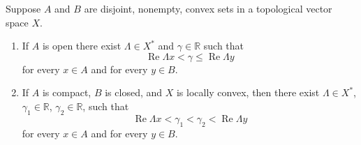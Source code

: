 \begin{theorem}
  \label{theorem-Hahn-Banach}
  Suppose \( A \) and \( B \) are disjoint, nonempty, convex sets in a topological vector space \( X \).
  \begin{enumerate}
    \item If \( A \) is open there exist \( \Lambda \in X^* \) and \( \gamma \in \mathbb{R} \) such that
          \[
            \operatorname{Re} \Lambda x < \gamma \leq \operatorname{Re} \Lambda y
          \]
          for every \( x \in A \) and for every \( y \in B \).
    \item If \( A \) is compact, \( B \) is closed, and \( X \) is locally convex, then there exist \( \Lambda \in X^* \), \( \gamma_1 \in \mathbb{R} \), \( \gamma_2 \in \mathbb{R} \), such that
          \[
            \operatorname{Re} \Lambda x < \gamma_1 < \gamma_2 < \operatorname{Re} \Lambda y
          \]
          for every \( x \in A \) and for every \( y \in B \).
  \end{enumerate}
\end{theorem}
